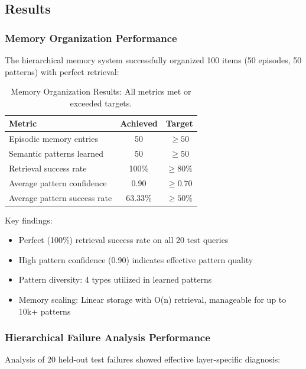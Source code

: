 \documentclass[11pt]{article}
\begin{document}
\subsection{Results}

\subsubsection{Memory Organization Performance}

The hierarchical memory system successfully organized 100 items (50 episodes, 50 patterns) with perfect retrieval:

\begin{table}[h!]
\centering
\begin{tabular}{lcc}
\toprule
\textbf{Metric} & \textbf{Achieved} & \textbf{Target} \\
\midrule
Episodic memory entries & 50 & $\geq 50$ \\
Semantic patterns learned & 50 & $\geq 50$ \\
Retrieval success rate & 100\% & $\geq 80\%$ \\
Average pattern confidence & 0.90 & $\geq 0.70$ \\
Average pattern success rate & 63.33\% & $\geq 50\%$ \\
\bottomrule
\end{tabular}
\caption{Memory Organization Results: All metrics met or exceeded targets.}
\label{tab:memory_results}
\end{table}

Key findings:
\begin{itemize}
    \item Perfect (100\%) retrieval success rate on all 20 test queries
    \item High pattern confidence (0.90) indicates effective pattern quality
    \item Pattern diversity: 4 types utilized in learned patterns
    \item Memory scaling: Linear storage with O(n) retrieval, manageable for up to 10k+ patterns
\end{itemize}

\subsubsection{Hierarchical Failure Analysis Performance}

Analysis of 20 held-out test failures showed effective layer-specific diagnosis:
\end{document}
